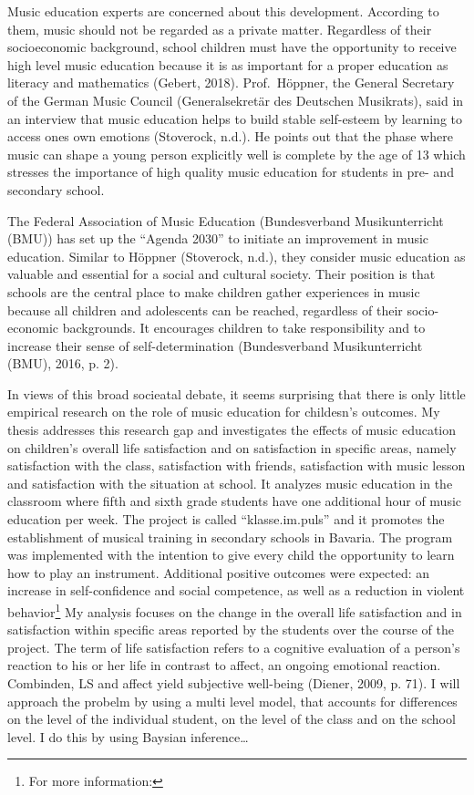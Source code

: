 \documentclass[a4, 12pt]{article}
\let\rmarkdownfootnote\footnote%
\def\footnote{\protect\rmarkdownfootnote}
\begin{document}
Music education experts are concerned about this development. According to them, music should not be regarded as a private matter. Regardless of their socioeconomic background, school children must have the opportunity to receive high level music education because it is as important for a proper education as literacy and mathematics (Gebert, 2018). Prof.~Höppner, the General Secretary of the German Music Council (Generalsekretär des Deutschen Musikrats), said in an interview that music education helps to build stable self-esteem by learning to access ones own emotions (Stoverock, n.d.). He points out that the phase where music can shape a young person explicitly well is complete by the age of 13 which stresses the importance of high quality music education for students in pre- and secondary school.

The Federal Association of Music Education (Bundesverband Musikunterricht (BMU)) has set up the ``Agenda 2030'' to initiate an improvement in music education. Similar to Höppner (Stoverock, n.d.), they consider music education as valuable and essential for a social and cultural society. Their position is that schools are the central place to make children gather experiences in music because all children and adolescents can be reached, regardless of their socio-economic backgrounds. It encourages children to take responsibility and to increase their sense of self-determination (Bundesverband Musikunterricht (BMU), 2016, p. 2).

In views of this broad socieatal debate, it seems surprising that there is only little empirical research on the role of music education for childesn's outcomes. My thesis addresses this research gap and investigates the effects of music education on children's overall life satisfaction and on satisfaction in specific areas, namely satisfaction with the class, satisfaction with friends, satisfaction with music lesson and satisfaction with the situation at school. It analyzes music education in the classroom where fifth and sixth grade students have one additional hour of music education per week. The project is called ``klasse.im.puls'' and it promotes the establishment of musical training in secondary schools in Bavaria. The program was implemented with the intention to give every child the opportunity to learn how to play an instrument. Additional positive outcomes were expected: an increase in self-confidence and social competence, as well as a reduction in violent behavior\footnote{For more information:}
My analysis focuses on the change in the overall life satisfaction and in satisfaction within specific areas reported by the students over the course of the project. The term of life satisfaction refers to a cognitive evaluation of a person's reaction to his or her life in contrast to affect, an ongoing emotional reaction. Combinden, LS and affect yield subjective well-being (Diener, 2009, p. 71). I will approach the probelm by using a multi level model, that accounts for differences on the level of the individual student, on the level of the class and on the school level. I do this by using Baysian inference\ldots{}
\end{document}

